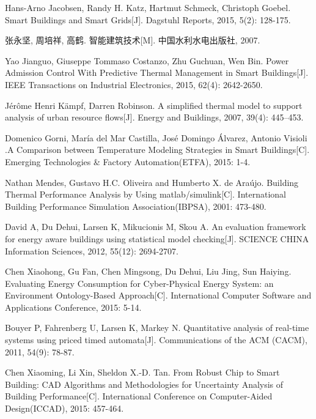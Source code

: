 \begin{thebibliography}{zz}

Hans-Arno Jacobsen, Randy H. Katz, Hartmut Schmeck, Christoph Goebel. Smart Buildings and Smart Grids[J]. Dagstuhl Reports, 2015, 5(2): 128-175.

张永坚, 周培祥, 高鹤. 智能建筑技术[M]. 中国水利水电出版社, 2007.

Yao Jianguo, Giuseppe Tommaso Costanzo, Zhu Guchuan, Wen Bin. Power Admission Control With Predictive Thermal Management in Smart Buildings[J]. IEEE Transactions on Industrial Electronics, 2015, 62(4): 2642-2650.

Jérôme Henri Kämpf, Darren Robinson. A simplified thermal model to support analysis of urban resource flows[J]. Energy and Buildings, 2007, 39(4): 445–453.

Domenico Gorni, María del Mar Castilla, José Domingo Álvarez, Antonio Visioli .A Comparison between Temperature Modeling Strategies in Smart Buildings[C]. Emerging Technologies \& Factory Automation(ETFA), 2015: 1-4.

Nathan Mendes, Gustavo H.C. Oliveira and Humberto X. de Araújo. Building Thermal Performance Analysis by Using matlab/simulink[C]. International Building Performance Simulation Association(IBPSA), 2001: 473-480.

David A, Du Dehui, Larsen K, Mikucionis M, Skou A. An evaluation framework for energy aware buildings using statistical model checking[J]. SCIENCE CHINA Information Sciences, 2012, 55(12): 2694-2707.

Chen Xiaohong, Gu Fan, Chen Mingsong, Du Dehui, Liu Jing, Sun Haiying. Evaluating Energy Consumption for Cyber-Physical Energy System: an Environment Ontology-Based Approach[C]. International Computer Software and Applications Conference, 2015: 5-14.

Bouyer P, Fahrenberg U, Larsen K, Markey N. Quantitative analysis of real-time systems using priced timed automata[J]. Communications of the ACM (CACM), 2011, 54(9): 78-87.

Chen Xiaoming, Li Xin, Sheldon X.-D. Tan. From Robust Chip to Smart Building: CAD Algorithms and Methodologies for Uncertainty Analysis of Building Performance[C]. International Conference on Computer-Aided Design(ICCAD), 2015: 457-464.


\end{thebibliography}
